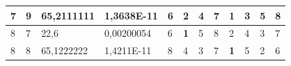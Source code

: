 \documentclass[conference]{IEEEtran}
\begin{document}
\begin{table}[]
\begin{tabular}{|llll|llllllll|}
\multicolumn{1}{|l|}{7}                                                     & \multicolumn{1}{l|}{9}                                                        & \multicolumn{1}{l|}{65,2111111}                                                   & 1,3638E-11                     & \multicolumn{1}{l|}{6}                                                  & \multicolumn{1}{l|}{2}                                                  & \multicolumn{1}{l|}{4}                                                  & \multicolumn{1}{l|}{7}                                                  & \multicolumn{1}{l|}{\textbf{1}}                                         & \multicolumn{1}{l|}{3}                                                  & \multicolumn{1}{l|}{5}                                                  & 8                          \\ \hline
\multicolumn{1}{|l|}{8}                                                     & \multicolumn{1}{l|}{7}                                                        & \multicolumn{1}{l|}{22,6}                                                         & 0,00200054                     & \multicolumn{1}{l|}{6}                                                  & \multicolumn{1}{l|}{\textbf{1}}                                         & \multicolumn{1}{l|}{5}                                                  & \multicolumn{1}{l|}{8}                                                  & \multicolumn{1}{l|}{2}                                                  & \multicolumn{1}{l|}{4}                                                  & \multicolumn{1}{l|}{3}                                                  & 7                          \\ \hline
\multicolumn{1}{|l|}{8}                                                     & \multicolumn{1}{l|}{8}                                                        & \multicolumn{1}{l|}{65,1222222}                                                   & 1,4211E-11                     & \multicolumn{1}{l|}{8}                                                  & \multicolumn{1}{l|}{4}                                                  & \multicolumn{1}{l|}{3}                                                  & \multicolumn{1}{l|}{7}                                                  & \multicolumn{1}{l|}{\textbf{1}}                                         & \multicolumn{1}{l|}{5}                                                  & \multicolumn{1}{l|}{2}                                                  & 6                          \\ \hline

\end{tabular}
\end{table}
\end{document}
